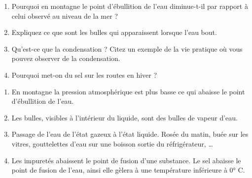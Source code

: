 \documentclass[
  11pt,
  french,
  a4paper,
  openany]{book}
\providecommand{\tightlist}{%
  \setlength{\itemsep}{0pt}\setlength{\parskip}{0pt}}
\begin{document}
\begin{Exercise}

\begin{enumerate}
\def\labelenumi{\arabic{enumi}.}
\tightlist
\item
  Pourquoi en montagne le point d'ébullition de l'eau diminue-t-il par rapport à celui observé au niveau de la mer ?\\
\item
  Expliquez ce que sont les bulles qui apparaissent lorsque l'eau bout.\\
\item
  Qu'est-ce que la condensation ? Citez un exemple de la vie pratique où vous pouvez observer de la condensation.\\
\item
  Pourquoi met-on du sel sur les routes en hiver ?\\
\end{enumerate}


\end{Exercise}

\begin{Answer}

\begin{enumerate}
\def\labelenumi{\arabic{enumi}.}
\tightlist
\item
  En montagne la pression atmosphérique est plus basse ce qui abaisse le point d'ébullition de l'eau.\\
\item
  Les bulles, visibles à l'intérieur du liquide, sont des bulles de vapeur d'eau.\\
\item
  Passage de l'eau de l'état gazeux à l'état liquide. Rosée du matin, buée sur les vitres, gouttelettes d'eau sur une boisson sortie du réfrigérateur, \ldots{}\\
\item
  Les impuretés abaissent le point de fusion d'une substance. Le sel abaisse le point de fusion de l'eau, ainsi elle gèlera à une température inférieure à 0° C.
\end{enumerate}

\newpage


\end{Answer}
\end{document}

